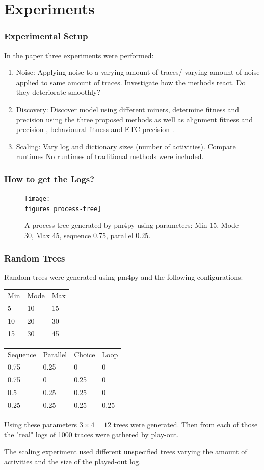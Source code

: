 \documentclass{beamer}
\newcommand{\figures}{../figures/}
\begin{document}
	\section{Experiments}
	\begin{frame}
		\frametitle{Experimental Setup}
		In the paper three experiments were performed:
		\begin{enumerate}
			\item Noise: Applying noise to a varying amount of traces/ varying amount of noise applied to same amount of traces. Investigate how the methods react. Do they deteriorate smoothly?
			\item Discovery: Discover model using different miners, determine fitness and precision using the three proposed methods as well as alignment fitness and precision \cite{Aals16}, behavioural fitness \cite{GMVB09} and ETC precision \cite{MuCa10}.
			\item Scaling: Vary log and dictionary sizes (number of activities). Compare runtimes \alert{No runtimes of traditional methods were included.}
		\end{enumerate}
	\end{frame}
\begin{frame}
	\frametitle{How to get the Logs?}
	\begin{figure}
		\texttt{[image: \\figures process-tree]}
		\caption{A process tree generated by pm4py using parameters: Min 15, Mode 30, Max 45, sequence 0.75, parallel 0.25. }
		\label{fig:process-tree}
	\end{figure}
\end{frame}
	\begin{frame}
		\frametitle{Random Trees}
		Random trees were generated using pm4py and the following configurations:
		
		\begin{center}
		\begin{tabular}{lll}
			Min & Mode & Max \\
			5 & 10 & 15 \\
			10 & 20 & 30 \\
			15 & 30 & 45 \\
		\end{tabular}
	\hspace{40pt}
		\begin{tabular}{llll}
			Sequence & Parallel & Choice & Loop \\
			0.75 & 0.25 & 0 & 0 \\
			0.75 & 0 & 0.25 & 0 \\
			0.5 & 0.25 & 0.25 & 0 \\
			0.25 & 0.25 & 0.25 & 0.25 \\
		\end{tabular}
	\end{center}

		Using these parameters $3\times4=12$ trees were generated.
		Then from each of those the "real" logs of 1000 traces were gathered by play-out.
		
		The scaling experiment used different unspecified trees varying the amount of activities and the size of the played-out log.
	\end{frame}
	
\end{document}
